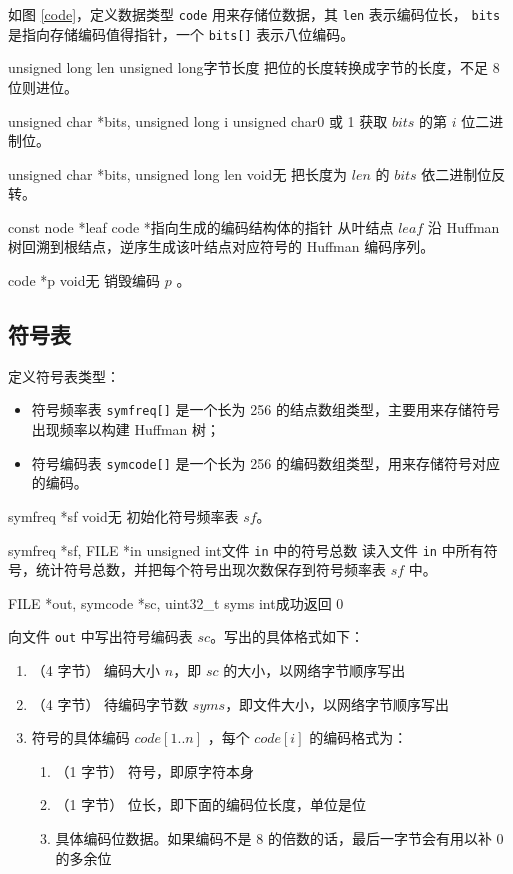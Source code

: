 如图 \ref{code}，定义数据类型 \verb|code| 用来存储位数据，其 \verb|len| 表示编码位长， \verb|bits| 是指向存储编码值得指针，一个 \verb|bits[]| 表示八位编码。

{unsigned long len}
{unsigned long}{字节长度}
{把位的长度转换成字节的长度，不足 8 位则进位。}

{unsigned char *bits, unsigned long i}
{unsigned char}{0 或 1}
{获取 $bits$ 的第 $i$ 位二进制位。}

{unsigned char *bits, unsigned long len}
{void}{无}
{把长度为 $len$ 的 $bits$ 依二进制位反转。}

{const node *leaf}
{code *}{指向生成的编码结构体的指针}
{从叶结点 $leaf$ 沿 Huffman 树回溯到根结点，逆序生成该叶结点对应符号的 Huffman 编码序列。}

{code *p}
{void}{无}
{销毁编码 $p$ 。}

\subsection{符号表}

定义符号表类型：
\begin{itemize}[topsep=0pt,partopsep=0pt,itemsep=0pt,parsep=0pt]
\item 符号频率表 \verb|symfreq[]| 是一个长为 256 的结点数组类型，主要用来存储符号出现频率以构建 Huffman 树；
\item 符号编码表 \verb|symcode[]| 是一个长为 256 的编码数组类型，用来存储符号对应的编码。
\end{itemize}

{symfreq *sf}
{void}{无}
{初始化符号频率表 $sf$。}

{symfreq *sf, FILE *in}
{unsigned int}{文件 {\tt in} 中的符号总数}
{读入文件 {\tt in} 中所有符号，统计符号总数，并把每个符号出现次数保存到符号频率表 $sf$ 中。}

{FILE *out, symcode *sc, uint32\_t syms}
{int}{成功返回 0}
{向文件 {\tt out} 中写出符号编码表 $sc$。写出的具体格式如下：
\begin{enumerate}[topsep=0pt,partopsep=0pt,itemsep=0pt,parsep=0pt]
  \item （4 字节） 编码大小 $n$，即 $sc$ 的大小，以网络字节顺序写出
  \item （4 字节） 待编码字节数 $syms$，即文件大小，以网络字节顺序写出
  \item 符号的具体编码 $code[1..n]$ ，每个 $code[i]$ 的编码格式为：
  \begin{enumerate}[topsep=0pt,partopsep=0pt,itemsep=0pt,parsep=0pt]
    \item （1 字节） 符号，即原字符本身
    \item （1 字节） 位长，即下面的编码位长度，单位是位
    \item 具体编码位数据。如果编码不是 8 的倍数的话，最后一字节会有用以补 0 的多余位
  \end{enumerate}
\end{enumerate}
}

